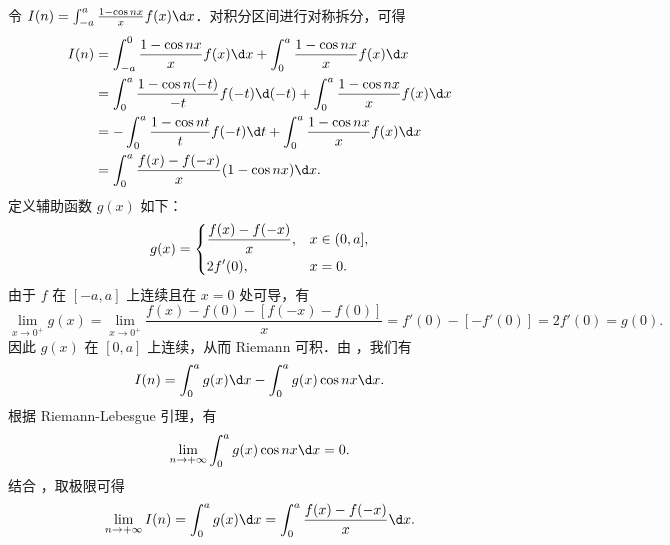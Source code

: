 \begin{myproof}
    令 $I(n) = \int_{-a}^{a} \frac{1 - \cos n x}{x} f(x) \d x$．对积分区间进行对称拆分，可得
    \begin{equation}\label{eq:split-5}
        \begin{aligned}
            I(n) & = \int_{-a}^{0} \frac{1 - \cos n x}{x} f(x) \d x + \int_{0}^{a} \frac{1 - \cos n x}{x} f(x) \d x      \\
                 & = \int_{0}^{a} \frac{1 - \cos n(-t)}{-t} f(-t) \d(-t) + \int_{0}^{a} \frac{1 - \cos n x}{x} f(x) \d x \\
                 & = -\int_{0}^{a} \frac{1 - \cos n t}{t} f(-t) \d t + \int_{0}^{a} \frac{1 - \cos n x}{x} f(x) \d x     \\
                 & = \int_{0}^{a} \frac{f(x) - f(-x)}{x} (1 - \cos n x) \d x.
        \end{aligned}
    \end{equation}
    定义辅助函数 $g(x)$ 如下：
    \begin{equation}
        g(x) = \begin{dcases}
            \frac{f(x) - f(-x)}{x}, & x \in (0, a], \\
            2f'(0),                 & x = 0.
        \end{dcases}
    \end{equation}
    由于 $f$ 在 $[-a, a]$ 上连续且在 $x = 0$ 处可导，有
    \begin{equation}
        \lim_{x \to 0^+} g(x) = \lim_{x \to 0^+} \frac{f(x) - f(0) - [f(-x) - f(0)]}{x} = f'(0) - [-f'(0)] = 2f'(0) = g(0).
    \end{equation}
    因此 $g(x)$ 在 $[0, a]$ 上连续，从而 Riemann 可积．由 ，我们有
    \begin{equation}
        I(n) = \int_{0}^{a} g(x) \d x - \int_{0}^{a} g(x) \cos n x \d x.
    \end{equation}
    根据 Riemann-Lebesgue 引理，有
    \begin{equation}\label{eq:riemann-lebesgue-5}
        \lim_{n \to +\infty} \int_{0}^{a} g(x) \cos n x \d x = 0.
    \end{equation}
    结合 ，取极限可得
    \begin{equation}
        \lim_{n \to +\infty} I(n) = \int_{0}^{a} g(x) \d x = \int_{0}^{a} \frac{f(x) - f(-x)}{x} \d x.
    \end{equation}
\end{myproof}

